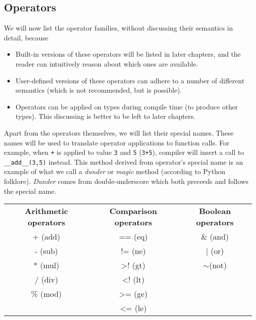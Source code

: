 \documentclass[times, utf8, diplomski]{fer}
\theoremstyle{definition}
\begin{document}
\subsection{Operators}

We will now list the operator families, without discussing their semantics in detail, because

\begin{itemize}
    \item Built-in versions of these operators will be listed in later chapters, and the reader
        can intuitively reason about which ones are available.
    \item User-defined versions of these operators can adhere to a number of different semantics 
        (which is not recommended, but is possible).
    \item Operators can be applied on types during compile time (to produce other types). 
        This discussing is better to be left to later chapters.
\end{itemize}

Apart from the operators themselves, we will list their special names. These names
will be used to translate operator applications to function calls. For example, when 
\texttt{+} is applied to value \texttt{3} and \texttt{5} (\texttt{3+5}), compiler
will insert a call to \texttt{\_\_add\_\_(3,5)} instead. This method derived from operator's special name
is an example of what we call a \textit{dunder} or \textit{magic} method (according to Python folklore).
\textit{Dunder} comes from double-underscore which both preceeds and follows the special name.

\begin{table}[H]
\begin{tabular}{ccc}
\textbf{Arithmetic operators} & \textbf{Comparison operators} & \textbf{Boolean operators} \\
+ (add)                       & == (eq)                       & \& (and)                   \\
- (sub)                       & != (ne)                       & | (or)                     \\
* (mul)                       & \textgreater{}! (gt)          & $\sim$(not)                \\
/ (div)                       & \textless{}! (lt)             &                            \\
\% (mod)                      & \textgreater{}= (ge)          &                            \\
                              & \textless{}= (le)             &                           
\end{tabular}
\end{table}
\end{document}
